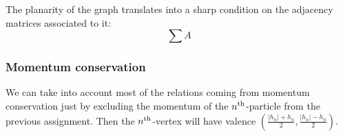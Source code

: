 \documentclass[aps,prd,nofootinbib,twocolumn,10pt]{revtex4-2}
\begin{document}
The planarity of the graph translates into a sharp condition on the adjacency matrices associated to it:
\begin{equation}
	\sum A
\end{equation}


\subsubsection{Momentum conservation}

We can take into account most of the relations coming from momentum conservation just by excluding the momentum of the $n^{\rm th}$-particle from the previous assignment. Then the $n^{\rm th}$-vertex will have valence $(\frac{|h_n|+h_n}{2},\frac{|h_n|-h_n}{2})$.
\end{document}
